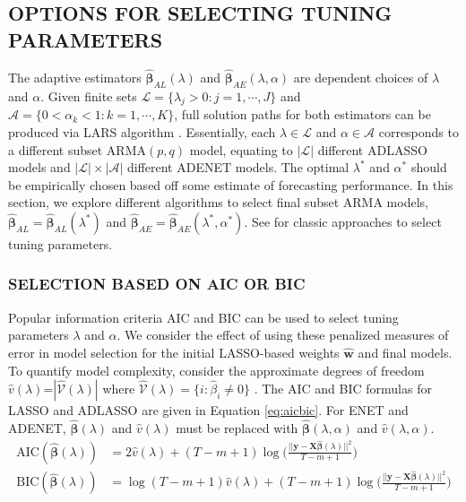 \subsection{OPTIONS FOR SELECTING TUNING PARAMETERS}
The adaptive estimators $\hat{\bm{\beta}}_{AL} (\lambda)$ and $\hat{\bm{\beta}}_{AE} (\lambda,\alpha)$ are dependent choices of $\lambda$ and $\alpha$. Given finite sets $\mathcal{L}=\{\lambda_j>0: j=1,\cdots,J\}$ and $\mathcal{A}=\{0<\alpha_k<1: k=1,\cdots,K\}$, full solution paths for both estimators can be produced via LARS algorithm \citep{Efron2004}. Essentially, each $\lambda\in\mathcal{L}$ and $\alpha\in\mathcal{A}$ corresponds to a different subset ARMA$(p,q)$ model, equating to $|\mathcal{L}|$ different ADLASSO models and $|\mathcal{L}|\times|\mathcal{A}|$ different ADENET models. The optimal $\lambda^*$ and $\alpha^*$ should be empirically chosen based off some estimate of forecasting performance. In this section, we explore different algorithms to select final subset ARMA models, $\hat{\bm{\beta}}_{AL}=\hat{\bm{\beta}}_{AL}(\lambda^*)$ and $\hat{\bm{\beta}}_{AE}=\hat{\bm{\beta}}_{AE}(\lambda^*,\alpha^*)$. See \cite[pg.241]{Hastie2009a} for classic approaches to select tuning parameters.

\subsubsection{SELECTION BASED ON AIC OR BIC}

Popular information criteria AIC and BIC can be used to select tuning parameters $\lambda$ and $\alpha$. We consider the effect of using these penalized measures of error in model selection for the initial LASSO-based weights $\hat{\bm{w}}$ and final models. To quantify model complexity, consider the approximate degrees of freedom $\hat{v}(\lambda)$=$|\widehat{\mathcal{V}}(\lambda)|$ where $\widehat{\mathcal{V}}(\lambda)=\{i:\hat{\beta}_i\neq 0\}$ \citep{Zou2007}. The AIC and BIC formulas for LASSO and ADLASSO are given in Equation \ref{eq:aicbic}. For ENET and ADENET, $\hat{\bm{\beta}}(\lambda)$ and $\hat{v}(\lambda)$ must be replaced with $\hat{\bm{\beta}}(\lambda,\alpha)$ and $\hat{v}(\lambda,\alpha)$.
\begin{equation}
\label{eq:aicbic}
\begin{split}
\textrm{AIC}(\hat{\bm{\beta}}(\lambda))&=2\hat{v}(\lambda)+(T-m+1)\log\bigg(\frac{||\bm{y}-\bm{X}\hat{\bm{\beta}}(\lambda)||^2}{T-m+1}\bigg)\\
\textrm{BIC}(\hat{\bm{\beta}}(\lambda))&=\log(T-m+1)\hat{v}(\lambda)+(T-m+1)\log\bigg(\frac{||\bm{y}-\bm{X}\hat{\bm{\beta}}(\lambda)||^2}{T-m+1}\bigg)\\
\end{split}
\end{equation}

